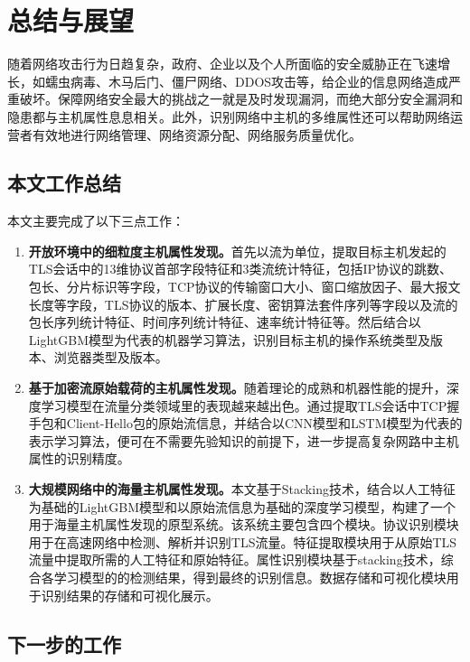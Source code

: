 \chapter{总结与展望}
随着网络攻击行为日趋复杂，政府、企业以及个人所面临的安全威胁正在飞速增长，如蠕虫病毒、木马后门、僵尸网络、DDOS攻击等，给企业的信息网络造成严重破坏。保障网络安全最大的挑战之一就是及时发现漏洞，而绝大部分安全漏洞和隐患都与主机属性息息相关。此外，识别网络中主机的多维属性还可以帮助网络运营者有效地进行网络管理、网络资源分配、网络服务质量优化。

\section{本文工作总结}

本文主要完成了以下三点工作：

\begin{enumerate}
    \item \textbf{开放环境中的细粒度主机属性发现。}首先以流为单位，提取目标主机发起的TLS会话中的13维协议首部字段特征和3类流统计特征，包括IP协议的跳数、包长、分片标识等字段，TCP协议的传输窗口大小、窗口缩放因子、最大报文长度等字段，TLS协议的版本、扩展长度、密钥算法套件序列等字段以及流的包长序列统计特征、时间序列统计特征、速率统计特征等。然后结合以LightGBM模型为代表的机器学习算法，识别目标主机的操作系统类型及版本、浏览器类型及版本。
    
    \item \textbf{基于加密流原始载荷的主机属性发现。}随着理论的成熟和机器性能的提升，深度学习模型在流量分类领域里的表现越来越出色。通过提取TLS会话中TCP握手包和Client-Hello包的原始流信息，并结合以CNN模型和LSTM模型为代表的表示学习算法，便可在不需要先验知识的前提下，进一步提高复杂网路中主机属性的识别精度。
    
    \item \textbf{大规模网络中的海量主机属性发现。}本文基于Stacking技术，结合以人工特征为基础的LightGBM模型和以原始流信息为基础的深度学习模型，构建了一个用于海量主机属性发现的原型系统。该系统主要包含四个模块。协议识别模块用于在高速网络中检测、解析并识别TLS流量。特征提取模块用于从原始TLS流量中提取所需的人工特征和原始特征。属性识别模块基于stacking技术，综合各学习模型的的检测结果，得到最终的识别信息。数据存储和可视化模块用于识别结果的存储和可视化展示。
\end{enumerate}

\section{下一步的工作}

